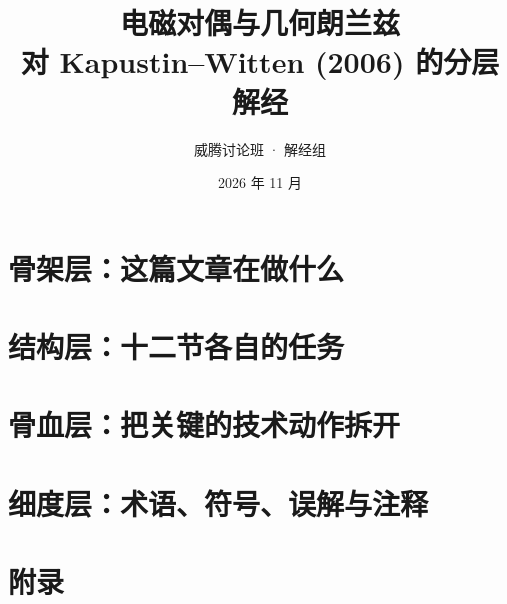 \documentclass[11pt,a4paper,fontset=fandol]{ctexart}
\title{\bfseries 电磁对偶与几何朗兰兹\\[6pt]
\large 对 Kapustin--Witten (2006) 的分层解经}
\author{威腾讨论班 · 解经组}
\date{2026 年 11 月}
\begin{document}
\maketitle



\tableofcontents
\clearpage

\part{骨架层：这篇文章在做什么}


\part{结构层：十二节各自的任务}



\part{骨血层：把关键的技术动作拆开}





\part{细度层：术语、符号、误解与注释}



\appendix
\part{附录}




\end{document}

